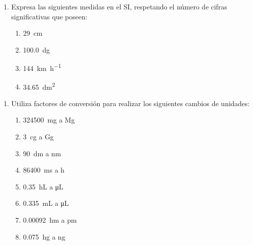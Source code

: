 \documentclass[
]{article}
\providecommand{\tightlist}{%
  \setlength{\itemsep}{0pt}\setlength{\parskip}{0pt}}
\begin{document}
\begin{enumerate}
\def\labelenumi{\arabic{enumi}.}
\tightlist
\item
  Expresa las siguientes medidas en el SI, respetando el número de
  cifras significativas que poseen:

  \begin{enumerate}
  \def\labelenumii{\alph{enumii})}
  \tightlist
  \item
    \SI{29}{\cm}
  \item
    \SI{100,0}{\deca\g}
  \item
    \SI{144}{\km\per\hour}
  \item
    \SI{34,65}{\square\dm}
  \end{enumerate}
\end{enumerate}

\begin{enumerate}
\def\labelenumi{\arabic{enumi}.}
\setcounter{enumi}{1}
\tightlist
\item
  Utiliza factores de conversión para realizar los siguientes cambios de
  unidades:

  \begin{enumerate}
  \def\labelenumii{\alph{enumii})}
  \tightlist
  \item
    \SI{324500}{\mg} a \si{\mega\g}
  \item
    \SI{3}{\centi\g} a \si{\giga\g}
  \item
    \SI{90}{\dm} a \si{\nm}
  \item
    \SI{86400}{\ms} a \si{\hour}
  \item
    \SI{0.35}{\hL} a \si{\uL}
  \item
    \SI{0.335}{\mL} a \si{\uL}
  \item
    \SI{0.00092}{\hecto\m} a \si{\pm}
  \item
    \SI{0.075}{\hecto\g} a \si{\ng}
  \end{enumerate}
\end{enumerate}
\end{document}
